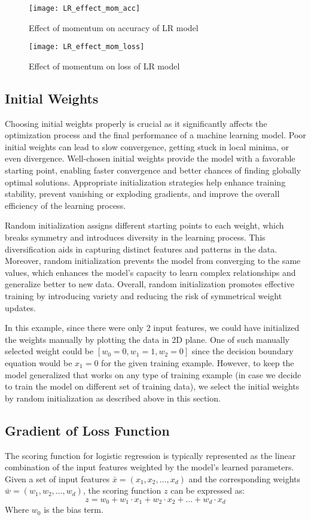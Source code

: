 \documentclass[12pt, a4paper, twoside]{article}
\begin{document}
\begin{figure}[h!]
	\centering
	\texttt{[image: LR\_effect\_mom\_acc]}
	\caption{Effect of momentum on  accuracy of LR model}
	\label{F:LR_effect_mom_acc}
\end{figure}
\begin{figure}[h!]
	\centering
	\texttt{[image: LR\_effect\_mom\_loss]}
	\caption{Effect of momentum on loss of LR model}
	\label{F:LR_effect_mom_loss}
\end{figure}

\subsection{Initial Weights}\label{SS:lr-w0}
Choosing initial weights properly is crucial as it significantly affects the optimization process and the final performance of a machine learning model. Poor initial weights can lead to slow convergence, getting stuck in local minima, or even divergence. Well-chosen initial weights provide the model with a favorable starting point, enabling faster convergence and better chances of finding globally optimal solutions. Appropriate initialization strategies help enhance training stability, prevent vanishing or exploding gradients, and improve the overall efficiency of the learning process.
\par
Random initialization assigns different starting points to each weight, which breaks symmetry and introduces diversity in the learning process. This diversification aids in capturing distinct features and patterns in the data. Moreover, random initialization prevents the model from converging to the same values, which enhances the model's capacity to learn complex relationships and generalize better to new data. Overall, random initialization promotes effective training by introducing variety and reducing the risk of symmetrical weight updates. 
\par
In this example, since there were only 2 input features, we could have initialized the weights manually by plotting the data in 2D plane. One of such manually selected weight could be $[w_0 = 0, w_1 = 1, w_2 = 0]$ since the decision boundary equation would be $x_1 = 0$ for the given training example. However, to keep the model generalized that works on any type of training example (in case we decide to train the model on different set of training data), we select the initial weights by random initialization as described above in this section.

\subsection{Gradient of Loss Function}\label{SS:lr-grad}
The scoring function for logistic regression is typically represented as the linear combination of the input features weighted by the model's learned parameters. Given a set of input features $\bar{x} = (x_1, x_2, \dots , x_d)$
and the corresponding weights $\bar{w} = (w_1, w_2, \dots , w_d)$, the scoring function $z$ can be expressed as:
\begin{equation}
	z = w_0 + w_1 \cdot x_1 + w_2 \cdot x_2 + \dots + w_d \cdot x_d
\end{equation}
Where $w_0$ is the bias term.
\end{document}
